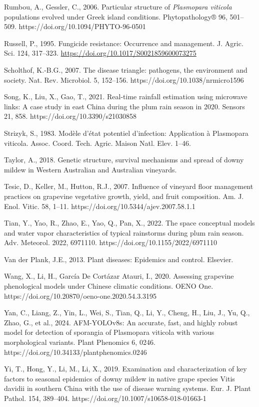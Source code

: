 \documentclass[
]{article}
\begin{document}
Rumbou, A., Gessler, C., 2006. Particular structure of \emph{Plasmopara
viticola} populations evolved under Greek island conditions.
Phytopathology® 96, 501--509. https://doi.org/10.1094/PHYTO-96-0501

Russell, P., 1995. Fungicide resistance: Occurrence and management. J.
Agric. Sci. 124, 317--323.
\url{https://doi.org/10.1017/S0021859600073275}

Scholthof, K.-B.G., 2007. The disease triangle: pathogens, the
environment and society. Nat. Rev. Microbiol. 5, 152--156.
https://doi.org/10.1038/nrmicro1596

Song, K., Liu, X., Gao, T., 2021. Real-time rainfall estimation using
microwave links: A case study in east China during the plum rain season
in 2020. Sensors 21, 858. https://doi.org/10.3390/s21030858

Strizyk, S., 1983. Modèle d'état potentiel d'infection: Application à
Plasmopara viticola. Assoc. Coord. Tech. Agric. Maison Natl. Elev.
1--46.

Taylor, A., 2018. Genetic structure, survival mechanisms and spread of
downy mildew in Western Australian and Australian vineyards.

Tesic, D., Keller, M., Hutton, R.J., 2007. Influence of vineyard floor
management practices on grapevine vegetative growth, yield, and fruit
composition. Am. J. Enol. Vitic. 58, 1--11.
https://doi.org/10.5344/ajev.2007.58.1.1

Tian, Y., Yao, R., Zhao, E., Yao, Q., Pan, X., 2022. The space
conceptual models and water vapor characteristics of typical rainstorms
during plum rain season. Adv. Meteorol. 2022, 6971110.
https://doi.org/10.1155/2022/6971110

Van der Plank, J.E., 2013. Plant diseases: Epidemics and control.
Elsevier.

Wang, X., Li, H., García De Cortázar Atauri, I., 2020. Assessing
grapevine phenological models under Chinese climatic conditions. OENO
One. https://doi.org/10.20870/oeno-one.2020.54.3.3195

Yan, C., Liang, Z., Yin, L., Wei, S., Tian, Q., Li, Y., Cheng, H., Liu,
J., Yu, Q., Zhao, G., et al., 2024. AFM-YOLOv8s: An accurate, fast, and
highly robust model for detection of sporangia of Plasmopara viticola
with various morphological variants. Plant Phenomics 6, 0246.
https://doi.org/10.34133/plantphenomics.0246

Yi, T., Hong, Y., Li, M., Li, X., 2019. Examination and characterization
of key factors to seasonal epidemics of downy mildew in native grape
species Vitis davidii in southern China with the use of disease warning
systems. Eur. J. Plant Pathol. 154, 389--404.
https://doi.org/10.1007/s10658-018-01663-1
\end{document}
